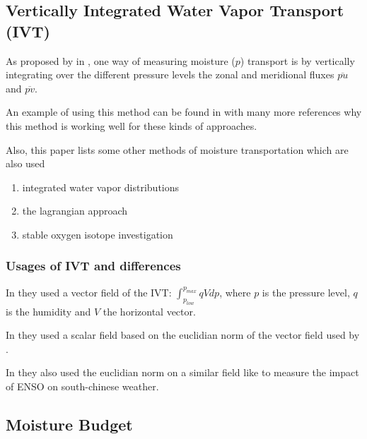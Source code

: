 \subsection{Vertically Integrated Water Vapor Transport (IVT)}

As proposed by \citeauthor{zhu_proposed_1998} in \cite{zhu_proposed_1998}, one way of measuring moisture ($p$) transport is by vertically integrating over the different pressure levels the zonal and meridional fluxes $\overline{pu}$ and $\overline{pv}$. 

An example of using this method can be found in \cite{ayantobo_integrated_2022} with many more references why this method is working well for these kinds of approaches. 

Also, this paper lists some other methods of moisture transportation which are also used

\begin{enumerate}
  \item integrated water vapor distributions
  \item the lagrangian approach
  \item stable oxygen isotope investigation
\end{enumerate}

\subsubsection{Usages of IVT and differences}

In \cite{ralph_dropsonde_2017} they used a vector field of the IVT: $\int_{p_{low}}^{p_{max}} qV dp$, where $p$ is the pressure level, $q$ is the humidity and $V$ the horizontal vector.

In \cite{sousa_north_2020} they used a scalar field based on the euclidian norm of the vector field used by \cite{ralph_dropsonde_2017}.


In \cite{ayantobo_integrated_2022} they also used the euclidian norm on a similar field like \cite{ralph_dropsonde_2017} to measure the impact of  ENSO on south-chinese weather.

\subsection{Moisture Budget}

